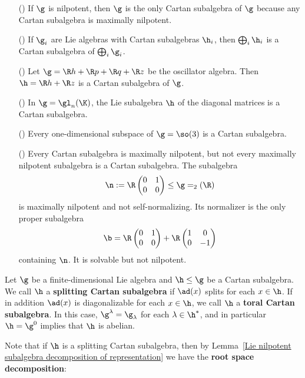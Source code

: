 \begin{example}
\mbox{}
\begin{itemize}
\item[(\rmnum{1})] If $\g$ is nilpotent, then $\g$ is the only Cartan subalgebra of $\g$ because any Cartan subalgebra is maximally nilpotent.
\item[(\rmnum{2})] If $\g_i$ are Lie algebras with Cartan subalgebras $\h_i$, then $\bigoplus_i\h_i$ is a Cartan subalgebra of $\bigoplus_i\g_i$.
\item[(\rmnum{3})] Let $\g=\R h+\R p+\R q+\R z$ be the oscillator algebra. Then $\h=\R h+\R z$ is a Cartan subalgebra of $\g$.
\item[(\rmnum{4})] In $\g=\gl_n(\K)$, the Lie subalgebra $\h$ of the diagonal matrices is a Cartan subalgebra.
\item[(\rmnum{5})] Every one-dimensional subspace of $\g=\so(3)$ is a Cartan subalgebra.
\item[(\rmnum{6})] Every Cartan subalgebra is maximally nilpotent, but not every maximally nilpotent subalgebra is a Cartan subalgebra. The subalgebra
\[
\n:=\R\begin{pmatrix}
0&1\\
0&0
\end{pmatrix}\leq\g=\sl_2(\R)\]
is maximally nilpotent and not self-normalizing. Its normalizer is the only proper subalgebra
\[\b=\R\begin{pmatrix}
0&1\\
0&0
\end{pmatrix}+\R\begin{pmatrix}
1&0\\
0&-1
\end{pmatrix}\]
containing $\n$. It is solvable but not nilpotent.
\end{itemize}
\end{example}
\begin{definition}
Let $\g$ be a finite-dimensional Lie algebra and $\h\leq\g$ be a Cartan subalgebra. We call $\h$ a \textbf{splitting Cartan subalgebra} if $\ad(x)$ splits for each $x\in\h$. If in addition $\ad(x)$ is diagonalizable for each $x\in\h$, we call $\h$ a \textbf{toral Cartan subalgebra}. In this case, $\g^\lambda=\g_{\lambda}$ for each $\lambda\in\h^*$, and in particular $\h=\g^0$ implies that $\h$ is abelian.
\end{definition}
Note that if $\h$ is a splitting Cartan subalgebra, then by Lemma~\ref{Lie nilpotent subalgebra decomposition of representation} we have the \textbf{root space decomposition}:
